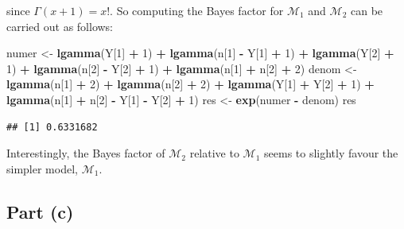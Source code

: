 \documentclass[
]{homework}
\newenvironment{Shaded}{\begin{snugshade}}{\end{snugshade}}
\newcommand{\DecValTok}[1]{\textcolor[rgb]{0.00,0.00,0.81}{#1}}
\newcommand{\FunctionTok}[1]{\textcolor[rgb]{0.13,0.29,0.53}{\textbf{#1}}}
\newcommand{\NormalTok}[1]{#1}
\newcommand{\OtherTok}[1]{\textcolor[rgb]{0.56,0.35,0.01}{#1}}
\newcommand{\SpecialCharTok}[1]{\textcolor[rgb]{0.81,0.36,0.00}{\textbf{#1}}}
\begin{document}
since \(\Gamma(x + 1) = x!\). So computing the Bayes factor for \(\mathcal M_1\) and \(\mathcal M_2\) can be carried out as follows:

\begin{Shaded}
\begin{Highlighting}[]
\NormalTok{numer }\OtherTok{\textless{}{-}} \FunctionTok{lgamma}\NormalTok{(Y[}\DecValTok{1}\NormalTok{] }\SpecialCharTok{+} \DecValTok{1}\NormalTok{) }\SpecialCharTok{+} \FunctionTok{lgamma}\NormalTok{(n[}\DecValTok{1}\NormalTok{] }\SpecialCharTok{{-}}\NormalTok{ Y[}\DecValTok{1}\NormalTok{] }\SpecialCharTok{+} \DecValTok{1}\NormalTok{) }\SpecialCharTok{+} \FunctionTok{lgamma}\NormalTok{(Y[}\DecValTok{2}\NormalTok{] }\SpecialCharTok{+} \DecValTok{1}\NormalTok{) }\SpecialCharTok{+} 
         \FunctionTok{lgamma}\NormalTok{(n[}\DecValTok{2}\NormalTok{] }\SpecialCharTok{{-}}\NormalTok{ Y[}\DecValTok{2}\NormalTok{] }\SpecialCharTok{+} \DecValTok{1}\NormalTok{) }\SpecialCharTok{+} \FunctionTok{lgamma}\NormalTok{(n[}\DecValTok{1}\NormalTok{] }\SpecialCharTok{+}\NormalTok{ n[}\DecValTok{2}\NormalTok{] }\SpecialCharTok{+} \DecValTok{2}\NormalTok{)}
\NormalTok{denom }\OtherTok{\textless{}{-}} \FunctionTok{lgamma}\NormalTok{(n[}\DecValTok{1}\NormalTok{] }\SpecialCharTok{+} \DecValTok{2}\NormalTok{) }\SpecialCharTok{+} \FunctionTok{lgamma}\NormalTok{(n[}\DecValTok{2}\NormalTok{] }\SpecialCharTok{+} \DecValTok{2}\NormalTok{) }\SpecialCharTok{+} \FunctionTok{lgamma}\NormalTok{(Y[}\DecValTok{1}\NormalTok{] }\SpecialCharTok{+}\NormalTok{ Y[}\DecValTok{2}\NormalTok{] }\SpecialCharTok{+} \DecValTok{1}\NormalTok{) }\SpecialCharTok{+} 
         \FunctionTok{lgamma}\NormalTok{(n[}\DecValTok{1}\NormalTok{] }\SpecialCharTok{+}\NormalTok{ n[}\DecValTok{2}\NormalTok{] }\SpecialCharTok{{-}}\NormalTok{ Y[}\DecValTok{1}\NormalTok{] }\SpecialCharTok{{-}}\NormalTok{ Y[}\DecValTok{2}\NormalTok{] }\SpecialCharTok{+} \DecValTok{1}\NormalTok{)}
\NormalTok{res }\OtherTok{\textless{}{-}} \FunctionTok{exp}\NormalTok{(numer }\SpecialCharTok{{-}}\NormalTok{ denom)}
\NormalTok{res}
\end{Highlighting}
\end{Shaded}

\begin{verbatim}
## [1] 0.6331682
\end{verbatim}

Interestingly, the Bayes factor of \(\mathcal M_2\) relative to \(\mathcal M_1\) seems to slightly favour the simpler model, \(\mathcal M_1\).

\subsection{Part (c)}\label{part-c-2}
\end{document}
